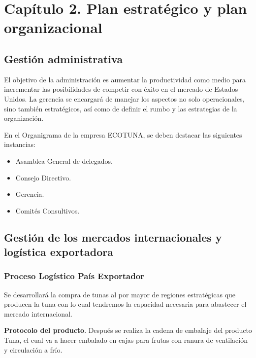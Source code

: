 \documentclass[
  stu,
  floatsintext,
  longtable,
  a4paper,
  nolmodern,
  notxfonts,
  notimes,
  colorlinks=true,linkcolor=blue,citecolor=blue,urlcolor=blue]{apa7}
\begin{document}
\section{Capítulo 2. Plan estratégico y plan
organizacional}\label{capuxedtulo-2.-plan-estratuxe9gico-y-plan-organizacional}

\subsection{Gestión administrativa}\label{gestiuxf3n-administrativa}

El objetivo de la administración es aumentar la productividad como medio
para incrementar las posibilidades de competir con éxito en el mercado
de Estados Unidos. La gerencia se encargará de manejar los aspectos no
solo operacionales, sino también estratégicos, así como de definir el
rumbo y las estrategias de la organización.

En el Organigrama de la empresa ECOTUNA, se deben destacar las
siguientes instancias:

\begin{itemize}
\item
  Asamblea General de delegados.
\item
  Consejo Directivo.
\item
  Gerencia.
\item
  Comités Consultivos.
\end{itemize}

\subsection{Gestión de los mercados internacionales y logística
exportadora}\label{gestiuxf3n-de-los-mercados-internacionales-y-loguxedstica-exportadora}

\subsubsection{Proceso Logístico País
Exportador}\label{proceso-loguxedstico-pauxeds-exportador}

Se desarrollará la compra de tunas al por mayor de regiones estratégicas
que producen la tuna con lo cual tendremos la capacidad necesaria para
abastecer el mercado internacional.

\textbf{Protocolo del producto}. Después se realiza la cadena de
embalaje del producto Tuna, el cual va a hacer embalado en cajas para
frutas con ranura de ventilación y circulación a frío.
\end{document}
